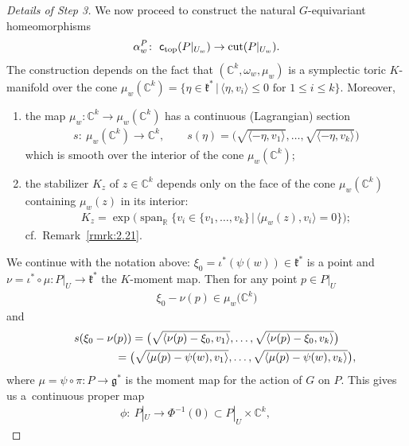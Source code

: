 \documentclass[pdftex]{sigma}
\numberwithin{equation}{section}
\begin{document}
\begin{proof}[Details of Step 3]
We now proceed to construct the natural $G$-equivariant homeomorphisms
\begin{gather*}
\alpha_w^P\colon \  {\textsf{c}_{\rm top}}(P|_{U_w}) \to \operatorname{cut}(P|_{U_w}).
\end{gather*}
The construction depends on the fact that $({\mathbb C}^k, \omega_w, \mu_w)$ is
a symplectic toric $K$-manifold over the cone $\mu_w ({\mathbb C}^k) = \{\eta
\in {\mathfrak k}^*\,|\, \langle \eta, v_i\rangle \leq 0 \text{ for } 1\leq i \leq k\}$.
Moreover,
\begin{enumerate}[1)]\itemsep=0pt
\item the map $\mu_w\colon {\mathbb C}^k \to \mu_w({\mathbb C}^k) $ has a continuous
  (Lagrangian) section
\begin{gather*}
s\colon \ \mu_w({\mathbb C}^k) \to {\mathbb C}^k, \qquad s(\eta) =
\big(\sqrt{\langle -\eta, v_1\rangle},\ldots, \sqrt{\langle -\eta, v_k\rangle}\big)
\end{gather*}
which is smooth over the interior of the cone $\mu_w ({\mathbb C}^k)$;
\item the stabilizer $K_z$ of $z\in {\mathbb C}^k$ depends only on the face of
  the cone $\mu_w ({\mathbb C}^k)$ containing $\mu_w(z)$ in its interior:
\begin{gather*}
K_z = \exp \big(\operatorname{span}_{\mathbb R} \{v_i \in \{v_1,\ldots, v_k\} \,|\, \langle
  \mu_w(z) , v_i\rangle = 0\}\big);
\end{gather*}
cf.\ Remark~\ref{rmrk:2.21}.
\end{enumerate}
We continue with the notation above: $\xi_0 = \iota^*(\psi(w)) \in
{\mathfrak k}^*$ is a point and $\nu= \iota^*\circ \mu \colon P|_U\to {\mathfrak k}^*$ the
$K$-moment map.  Then for any point $p\in P|_U$
\begin{gather*}
\xi_0 -\nu(p) \in \mu_w\big({\mathbb C}^k\big)
\end{gather*}
and
\begin{gather*}
s(\xi_0 -\nu(p) )  =  \big(\sqrt{\langle \nu(p) -\xi_0, v_1\rangle},\ldots,
\sqrt{\langle \nu(p) -\xi_0, v_k\rangle}\big)\\
\hphantom{s(\xi_0 -\nu(p) )}{}
 =  \big(\sqrt{\langle \mu(p) -\psi (w),
  v_1\rangle},\ldots, \sqrt{\langle \mu(p) -\psi(w), v_k\rangle}\big),
\end{gather*}
where $\mu = \psi \circ \pi\colon P\to {\mathfrak g}^*$ is the moment map for the
action of $G$ on $P$.  This gives us a~continuous proper map
\begin{gather*}
\phi\colon \  P|_U\to \Phi^{-1} (0) \subset P|_U \times {\mathbb C}^k, \qquad

\end{gather*}
\end{proof}
\end{document}
